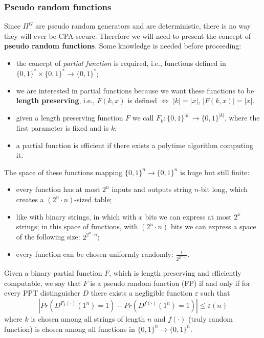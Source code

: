 \documentclass[../main]{subfiles}
\begin{document}
\subsubsection{Pseudo random functions}
Since $\Pi^G$ are pseudo random generators and are deterministic, there is no way they will ever be CPA-secure.
Therefore we will need to present the concept of \textbf{pseudo random functions}.
Some knowledge is needed before proceeding:
\begin{itemize}
    \item the concept of \textit{partial function} is required, i.e., functions defined in $\{0,1\}^*\times\{0,1\}^*\rightarrow\{0,1\}^*$;
    \item we are interested in partial functions because we want these functions to be \textbf{length preserving}, i.e., $F(k,x)$ is defined $\Leftrightarrow$ $|k| = |x|$, $|F(k,x)| = |x|$.
    \item given a length preserving function $F$ we call $F_k: \{0,1\}^{|k|} \rightarrow{} \{0,1\}^{|k|}$, where the first parameter is fixed and is $k$;
    \item a partial function is efficient if there exists a polytime algorithm computing it.
\end{itemize}
The space of these functions mapping $\{0,1\}^n \rightarrow{} \{0,1\}^n$ is huge but still finite:
\begin{itemize}
    \item every function has at most $2^n$ inputs and outputs string $n$-bit long, which creates a $(2^n \cdot{} n)$-sized table;
    \item like with binary strings, in which with $x$ bits we can express at most $2^x$ strings; in this space of functions, with $(2^n \cdot{} n)$ bits we can express a space of the following size: $2^{2^n \cdot{} n}$;
    \item every function can be chosen uniformly randomly: $\frac{1}{2^{2^n \cdot{} n}}$.
\end{itemize}

\begin{definition}
    Given a binary partial function $F$, which is length preserving and efficiently computable, 
    we say that $F$ is a pseudo random function (FP) if and only if for every PPT distinguisher $D$ 
    there exists a negligible function $\varepsilon$ such that
    $$|Pr(D^{F_k(\cdot)}(1^n)=1)-Pr(D^{f(\cdot)}(1^n)=1)|\le{}\varepsilon(n)$$
    where $k$ is chosen among all strings of length $n$ and $f(\cdot)$ (truly random function) is chosen among all functions in $\{0,1\}^n \rightarrow{} \{0,1\}^n$.
\end{definition}
\end{document}
